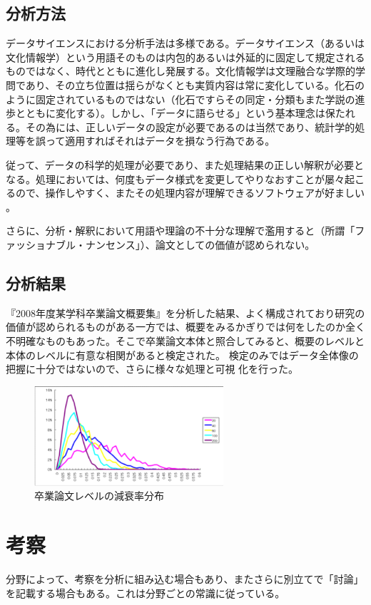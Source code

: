 \documentclass[twoside,uplatex]{ujarticle}
\begin{document}
\subsection{分析方法}
データサイエンスにおける分析手法は多様である。データサイエンス（あるいは
文化情報学）という用語そのものは内包的あるいは外延的に固定して規定される
ものではなく、時代とともに進化し発展する。文化情報学は文理融合な学際的学
問であり、その立ち位置は揺らがなくとも実質内容は常に変化している。化石の
ように固定されているものではない（化石ですらその同定・分類もまた学説の進
歩とともに変化する）。しかし、「データに語らせる」という基本理念は保たれ
る。その為には、正しいデータの設定が必要であるのは当然であり、統計学的処
理等を誤って適用すればそれはデータを損なう行為である。

従って、データの科学的処理が必要であり、また処理結果の正しい解釈が必要と
なる。処理においては、何度もデータ様式を変更してやりなおすことが屡々起こ
るので、操作しやすく、またその処理内容が理解できるソフトウェアが好ましい
。

さらに、分析・解釈において用語や理論の不十分な理解で濫用すると（所謂「フ
ァッショナブル・ナンセンス」）、論文としての価値が認められない。


\subsection{分析結果}
『2008年度某学科卒業論文概要集』を分析した結果、よく構成されており研究の
価値が認められるものがある一方では、概要をみるかぎりでは何をしたのか全く
不明確なものもあった。そこで卒業論文本体と照合してみると、概要のレベルと
本体のレベルに有意な相関があると検定された。
検定のみではデータ全体像の把握に十分ではないので、さらに様々な処理と可視
化を行った。

\begin{figure}[htb]
 \centering
 \includegraphics[width=7cm,clip]{sample.pdf}
 \caption{卒業論文レベルの減衰率分布}
 \label{fig:sample}
\end{figure}

\section{考察}
分野によって、考察を分析に組み込む場合もあり、またさらに別立てで「討論」
を記載する場合もある。これは分野ごとの常識に従っている。
\end{document}
